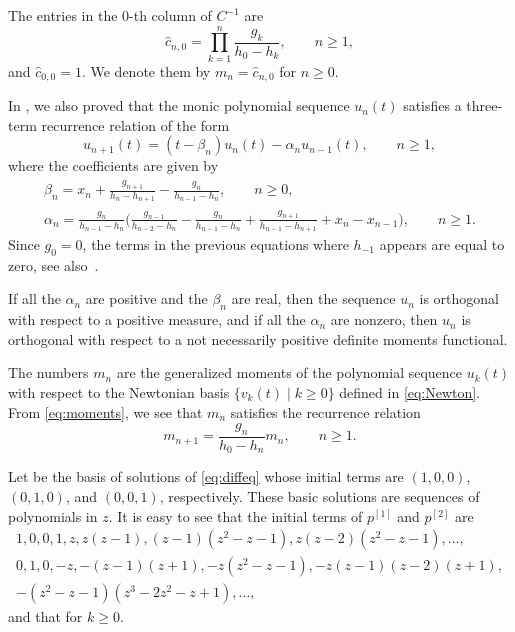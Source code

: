 \documentclass[10pt,a4paper]{amsart}
\def\hc{\hat c}
\numberwithin{equation}{section}
\begin{document}
	 The entries in the 0-th column of $C^{-1}$ are
\begin{equation}\label{eq:moments}
 \hc_{n,0} =\prod_{k=1}^n \frac{g_k}{h_0-h_k}, \qquad n \ge 1,
	\end{equation}
and $\hc_{0,0}=1$. We denote them by $m_n=\hc_{n,0}$ for $ n \ge 0$.

In \cite{Uni}, we also proved that the monic polynomial sequence $u_n(t)$ satisfies a three-term recurrence relation of the form
\begin{equation}\label{eq:3term}
	u_{n+1}(t)= (t-\beta_n) u_n(t) - \alpha_n u_{n-1}(t), \qquad n \ge 1,
\end{equation}
where the coefficients are given by
\begin{gather}\label{eq:beta}
	\beta_n= x_n + \frac{g_{n+1}}{h_n - h_{n+1}} -\frac{g_n}{h_{n-1} - h_n}, \qquad n\ge 0,
\\
\label{eq:alpha}
 \alpha_n = \frac{g_n}{h_{n-1} -h_n} \biggl(\frac{g_{n-1}}{h_{n-2} - h_n} - \frac{g_n}{h_{n-1} - h_n} + \frac{g_{n+1}}{h_{n-1}-h_{n+1}} +x_n - x_{n-1} \biggr), \qquad n\ge 1.\!\!
\end{gather}
Since $g_0=0$, the terms in the previous equations where $h_{-1}$ appears are equal to zero, see also~\mbox{\cite[Remark~2.5]{K3}}.

If all the $\alpha_n$ are positive and the $\beta_n$ are real, then the sequence $u_n$ is orthogonal with respect to a positive measure, and if all the $\alpha_n$ are nonzero, then $u_n$ is orthogonal with respect to a not necessarily positive definite moments functional.

The numbers $m_n$ are the generalized moments of the polynomial sequence $u_k(t)$ with respect to the Newtonian basis $\{ v_k(t)\mid k \ge 0 \}$ defined in \eqref{eq:Newton}.
From \eqref{eq:moments}, we see that $m_n$ satisfies the recurrence relation
\[
	 m_{n+1}=\dfrac{g_n}{h_0 -h_n} m_n, \qquad n\ge 1.
 \]

Let  be the basis of solutions of \eqref{eq:diffeq} whose initial terms are $(1,0,0)$, $(0,1,0)$, and $(0,0,1)$, respectively.
These basic solutions are sequences of polynomials in $z$. It is easy to see that the initial terms of $p^{[1]}$ and $p^{[2]}$ are
\begin{gather*}
1,0,0,1,z,z (z-1), (z-1)(z^2-z-1),z (z-2)(z^2-z-1), \dots,
\\
0,1,0,-z, -(z-1)(z+1), -z(z^2-z-1), -z(z-1)(z-2)(z+1),\\
 -(z^2-z-1)(z^3-2 z^2 -z+1), \dots,
\end{gather*}
and that  for $k \ge 0$.
\end{document}
